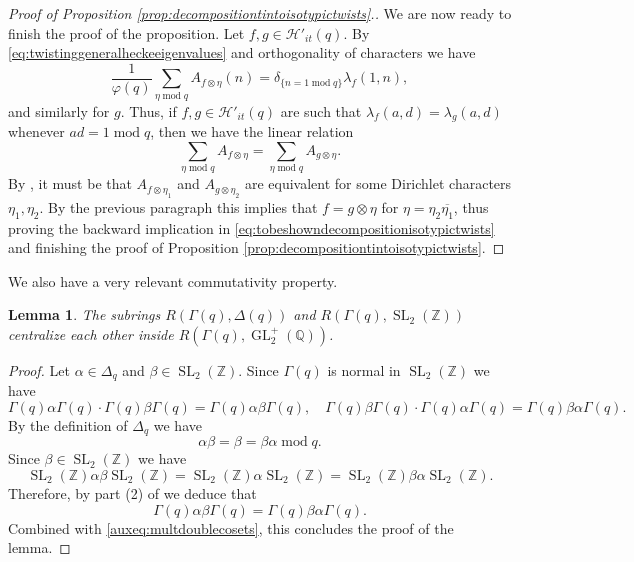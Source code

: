 \documentclass{article}
\newtheorem{lem}[thm]{Lemma}
\theoremstyle{named}
\newcommand{\HH}{\mathcal{H}}
\newcommand{\Z}{\mathbb{Z}}
\newcommand{\Q}{\mathbb{Q}}
\DeclareMathOperator{\SL}{SL}
\DeclareMathOperator{\GL}{GL}
\DeclareMathOperator{\modulo}{mod}
\begin{document}
\begin{proof}[Proof of Proposition \ref{prop:decompositiontintoisotypictwists}.]
We are now ready to finish the proof of the proposition. Let $f, g \in \HH'_{it}(q)$.  By \eqref{eq:twistinggeneralheckeeigenvalues} and orthogonality of characters we have  
\begin{equation*}
    \frac{1}{\varphi(q)}\sum_{\eta \modulo q} A_{f \otimes \eta}(n) = \delta_{\{n = 1 \modulo q\}} \lambda_f(1, n),
\end{equation*}
and similarly for $g$. Thus, if $f, g \in \HH'_{it}(q)$ are such that $\lambda_f(a, d) = \lambda_g(a, d)$ whenever $ad = 1 \modulo q$, then we have the linear relation
\begin{equation*}
    \sum_{\eta \modulo q} A_{f\otimes \eta} = \sum_{\eta \modulo q} A_{g\otimes \eta}.
\end{equation*}
By \cite[Theorem 2]{linearindependenceLfunctions}, it must be that $A_{f\otimes \eta_1}$ and $A_{g \otimes \eta_2}$ are equivalent for some Dirichlet characters $\eta_1, \eta_2$. By the previous paragraph this implies that $f = g\otimes \eta$ for $\eta = \eta_2 \overline{\eta_1}$, thus proving the backward implication in \eqref{eq:tobeshowndecompositionisotypictwists} and finishing the proof of Proposition \ref{prop:decompositiontintoisotypictwists}.
\end{proof}

We also have a very relevant commutativity property.
\begin{lem}\label{lem:DeltaqcentralizesSL2}
The subrings $R(\Gamma(q), \Delta(q))$ and $R(\Gamma(q), \SL_2(\Z))$ centralize each other inside $R(\Gamma(q), \GL_2^+(\Q))$. 
\end{lem}

\begin{proof}
Let $\alpha \in \Delta_q$ and $\beta \in \SL_2(\Z)$. Since $\Gamma(q)$ is normal in $\SL_2(\Z)$ we have 
\begin{equation}\label{auxeq:multdoublecosets}
    \Gamma(q) \alpha \Gamma(q) \cdot \Gamma(q)\beta \Gamma(q) = \Gamma(q) \alpha \beta \Gamma(q), \quad \Gamma(q) \beta \Gamma(q) \cdot \Gamma(q)\alpha \Gamma(q) = \Gamma(q) \beta \alpha \Gamma(q).
\end{equation}
By the definition of $\Delta_q$ we have 
\begin{equation*}
    \alpha \beta = \beta = \beta \alpha \modulo q.
\end{equation*}
Since $\beta \in \SL_2(\Z)$ we have
\begin{equation*}
    \SL_2(\Z)\alpha \beta \SL_2(\Z) = \SL_2(\Z)\alpha\SL_2(\Z) = \SL_2(\Z)\beta \alpha \SL_2(\Z).
\end{equation*}
Therefore, by part (2) of \cite[Lemma 3.29]{shimurabook} we deduce that 
\begin{equation*}
    \Gamma(q)\alpha \beta\Gamma(q) = \Gamma(q)\beta \alpha\Gamma(q).
\end{equation*}
Combined with \eqref{auxeq:multdoublecosets}, this concludes the proof of the lemma.
\end{proof}
\end{document}
